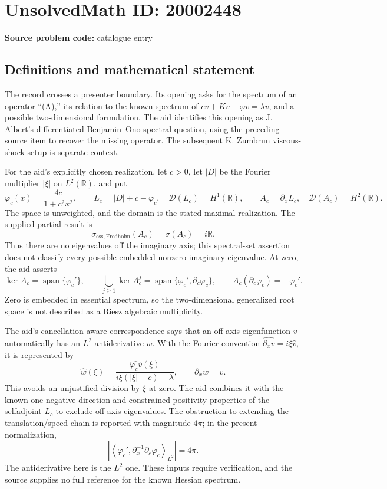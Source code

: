 \documentclass[11pt]{article}
\newcommand{\R}{\mathbb{R}}
\begin{document}
\section*{UnsolvedMath ID: 20002448}
\textbf{Source problem code:} catalogue entry
\subsection{Definitions and mathematical statement}
The record crosses a presenter boundary. Its opening asks for the spectrum of an operator ``(A),'' its relation to the known spectrum of $cv+Kv-\varphi v=\lambda v$, and a possible two-dimensional formulation. The aid identifies this opening as J. Albert's differentiated Benjamin--Ono spectral question, using the preceding source item to recover the missing operator. The subsequent K. Zumbrun viscous-shock setup is separate context.

For the aid's explicitly chosen realization, let $c>0$, let $|D|$ be the Fourier multiplier $|\xi|$ on $L^2(\R)$, and put
\[
\varphi_c(x)=\frac{4c}{1+c^2x^2},\qquad
L_c=|D|+c-\varphi_c,\quad\mathcal D(L_c)=H^1(\R),\qquad
A_c=\partial_xL_c,\quad\mathcal D(A_c)=H^2(\R).
\]
The space is unweighted, and the domain is the stated maximal realization. The supplied partial result is
\[
\sigma_{\mathrm{ess,Fredholm}}(A_c)=\sigma(A_c)=i\R.
\]
Thus there are no eigenvalues off the imaginary axis; this spectral-set assertion does not classify every possible embedded nonzero imaginary eigenvalue. At zero, the aid asserts
\[
\ker A_c=\operatorname{span}\{\varphi_c'\},\qquad
\bigcup_{j\geq1}\ker A_c^j
=\operatorname{span}\{\varphi_c',\partial_c\varphi_c\},\qquad
A_c(\partial_c\varphi_c)=-\varphi_c'.
\]
Zero is embedded in essential spectrum, so the two-dimensional generalized root space is not described as a Riesz algebraic multiplicity.

The aid's cancellation-aware correspondence says that an off-axis eigenfunction $v$ automatically has an $L^2$ antiderivative $w$. With the Fourier convention $\widehat{\partial_xv}=i\xi\widehat v$, it is represented by
\[
\widehat w(\xi)=\frac{\widehat{\varphi_cv}(\xi)}{i\xi(|\xi|+c)-\lambda},\qquad
\partial_xw=v.
\]
This avoids an unjustified division by $\xi$ at zero. The aid combines it with the known one-negative-direction and constrained-positivity properties of the selfadjoint $L_c$ to exclude off-axis eigenvalues. The obstruction to extending the translation/speed chain is reported with magnitude $4\pi$; in the present normalization,
\[
\left|\left\langle\varphi_c',\partial_x^{-1}\partial_c\varphi_c\right\rangle_{L^2}\right|=4\pi.
\]
The antiderivative here is the $L^2$ one. These inputs require verification, and the source supplies no full reference for the known Hessian spectrum.
\end{document}
